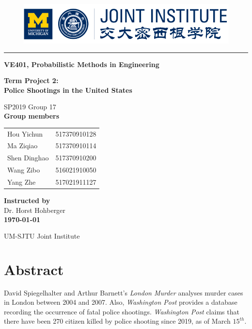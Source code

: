 \documentclass[a4paper]{article}
\begin{document}
\begin{titlepage}
\begin{figure}[!htbp]
\center
\includegraphics[width=12cm]{ji_logo.png}
\end{figure}
\noindent\rule[0.25\baselineskip]{\textwidth}{1pt}
\begin{center}
\Large{\bfseries  VE401, Probabilistic Methods in Engineering}
\vspace{1cm}

\Huge{\bfseries  Term Project 2:}\\
\Huge{\bfseries Police Shootings in the United States}

\vspace{1.5cm}

\Large SP2019  Group 17\\
\Large \textbf{Group members}\\

\begin{tabular}{l l}
Hou Yichun & 517370910128\\
Ma Ziqiao & 517370910114\\
Shen Dinghao & 517370910200\\
Wang Zibo & 516021910050\\
Yang Zhe & 517021911127\\
\end{tabular}

\vspace{1cm}
\Large \textbf{Instructed by}\\
\Large Dr. Horst Hohberger\\

\vspace{1cm}
{\bfseries \today}\\
\vspace{1cm}

UM-SJTU Joint Institute
\end{center}
\end{titlepage}
\section{Abstract}
David Spiegelhalter and Arthur Barnett's \textit{London Murder} analyses murder cases in London between 2004 and 2007. Also, \textit{Washington Post} provides a database recording the occurrence of fatal police shootings. \textit{Washington Post} claims that there have been 270 citizen killed by police shooting since 2019, as of March $15^{th}$.
\end{document}
